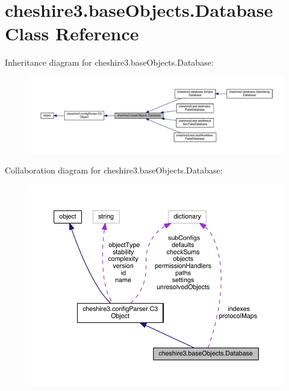 \hypertarget{classcheshire3_1_1base_objects_1_1_database}{\section{cheshire3.\-base\-Objects.\-Database Class Reference}
\label{classcheshire3_1_1base_objects_1_1_database}
}


Inheritance diagram for cheshire3.\-base\-Objects.\-Database\-:
\nopagebreak
\begin{figure}[H]
\begin{center}
\leavevmode
\includegraphics[width=350pt]{classcheshire3_1_1base_objects_1_1_database__inherit__graph}
\end{center}
\end{figure}


Collaboration diagram for cheshire3.\-base\-Objects.\-Database\-:
\nopagebreak
\begin{figure}[H]
\begin{center}
\leavevmode
\includegraphics[width=350pt]{classcheshire3_1_1base_objects_1_1_database__coll__graph}
\end{center}
\end{figure}
